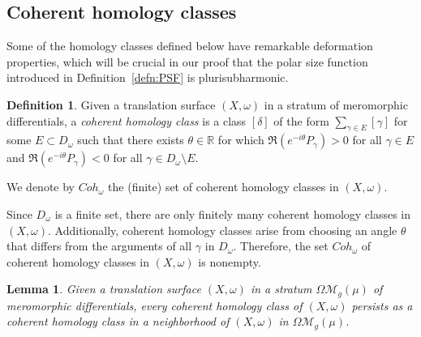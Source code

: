 \documentclass[11]{amsart}
\theoremstyle{plain}
\newtheorem{lemma}[theorem]{Lemma}
\theoremstyle{definition}
\newtheorem{definition}[theorem]{Definition}
\begin{document}
\subsection{Coherent homology classes}

Some of the homology classes defined below have remarkable deformation properties, which will be crucial in our proof that the polar size function introduced in Definition~\ref{defn:PSF} is plurisubharmonic. 

\begin{definition}
Given a translation surface $(X,\omega)$ in a stratum of meromorphic differentials, a \textit{coherent homology class} is a class $[\delta]$ of the form $\sum\limits_{\gamma \in E} [\gamma]$ for some $E \subset D_\omega$ such that there exists $\theta \in \mathbb{R}$ for which $\Re\left(e^{-i\theta} P_{\gamma} \right)>0$ for all $\gamma \in E$ and $\Re\left(e^{-i\theta} P_{\gamma} \right)<0$ for all $\gamma \in D_\omega\setminus E$.
\par
We denote by $Coh_{\omega}$ the (finite) set of coherent homology classes in $(X,\omega)$. 
\end{definition}

Since $D_\omega$ is a finite set, there are only finitely many coherent homology classes in $(X,\omega)$. Additionally, coherent homology classes arise from choosing an angle $\theta$ that differs from the arguments of all $\gamma$ in $D_\omega$. Therefore, the set $Coh_{\omega}$ of coherent homology classes in $(X,\omega)$ is nonempty.   

\begin{lemma}\label{lem:Persistence}
Given a translation surface $(X,\omega)$ in a stratum $\Omega\mathcal{M}_{g}(\mu)$ of meromorphic differentials, every coherent homology class of $(X,\omega)$ persists as a coherent homology class in a neighborhood of $(X,\omega)$ in $\Omega\mathcal{M}_{g}(\mu)$.
\end{lemma}
\end{document}
